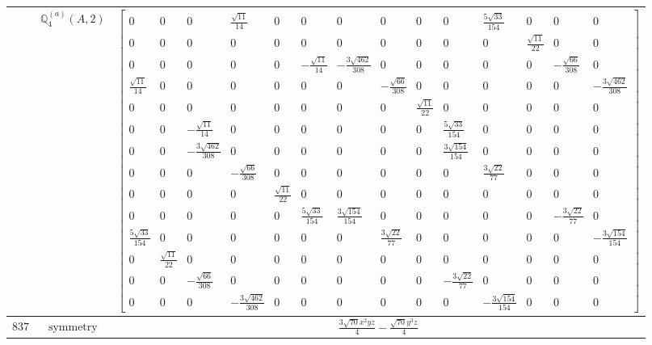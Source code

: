\documentclass[fleqn,8pt,landscape]{jsarticle}
\begin{document}
\begin{longtable}{ccc}
$  $ & $ \mathbb{Q}_{4}^{(a)}(A,2) $ & $ \begin{bmatrix} 0 & 0 & 0 & \frac{\sqrt{11}}{14} & 0 & 0 & 0 & 0 & 0 & 0 & \frac{5 \sqrt{33}}{154} & 0 & 0 & 0 \\ 0 & 0 & 0 & 0 & 0 & 0 & 0 & 0 & 0 & 0 & 0 & \frac{\sqrt{11}}{22} & 0 & 0 \\ 0 & 0 & 0 & 0 & 0 & - \frac{\sqrt{11}}{14} & - \frac{3 \sqrt{462}}{308} & 0 & 0 & 0 & 0 & 0 & - \frac{\sqrt{66}}{308} & 0 \\ \frac{\sqrt{11}}{14} & 0 & 0 & 0 & 0 & 0 & 0 & - \frac{\sqrt{66}}{308} & 0 & 0 & 0 & 0 & 0 & - \frac{3 \sqrt{462}}{308} \\ 0 & 0 & 0 & 0 & 0 & 0 & 0 & 0 & \frac{\sqrt{11}}{22} & 0 & 0 & 0 & 0 & 0 \\ 0 & 0 & - \frac{\sqrt{11}}{14} & 0 & 0 & 0 & 0 & 0 & 0 & \frac{5 \sqrt{33}}{154} & 0 & 0 & 0 & 0 \\ 0 & 0 & - \frac{3 \sqrt{462}}{308} & 0 & 0 & 0 & 0 & 0 & 0 & \frac{3 \sqrt{154}}{154} & 0 & 0 & 0 & 0 \\ 0 & 0 & 0 & - \frac{\sqrt{66}}{308} & 0 & 0 & 0 & 0 & 0 & 0 & \frac{3 \sqrt{22}}{77} & 0 & 0 & 0 \\ 0 & 0 & 0 & 0 & \frac{\sqrt{11}}{22} & 0 & 0 & 0 & 0 & 0 & 0 & 0 & 0 & 0 \\ 0 & 0 & 0 & 0 & 0 & \frac{5 \sqrt{33}}{154} & \frac{3 \sqrt{154}}{154} & 0 & 0 & 0 & 0 & 0 & - \frac{3 \sqrt{22}}{77} & 0 \\ \frac{5 \sqrt{33}}{154} & 0 & 0 & 0 & 0 & 0 & 0 & \frac{3 \sqrt{22}}{77} & 0 & 0 & 0 & 0 & 0 & - \frac{3 \sqrt{154}}{154} \\ 0 & \frac{\sqrt{11}}{22} & 0 & 0 & 0 & 0 & 0 & 0 & 0 & 0 & 0 & 0 & 0 & 0 \\ 0 & 0 & - \frac{\sqrt{66}}{308} & 0 & 0 & 0 & 0 & 0 & 0 & - \frac{3 \sqrt{22}}{77} & 0 & 0 & 0 & 0 \\ 0 & 0 & 0 & - \frac{3 \sqrt{462}}{308} & 0 & 0 & 0 & 0 & 0 & 0 & - \frac{3 \sqrt{154}}{154} & 0 & 0 & 0 \end{bmatrix} $ \\ \hline
$ 837 $ & $ \text{symmetry} $ & $ \frac{3 \sqrt{70} x^{2} y z}{4} - \frac{\sqrt{70} y^{3} z}{4} $ \\

\end{longtable}
\end{document}

